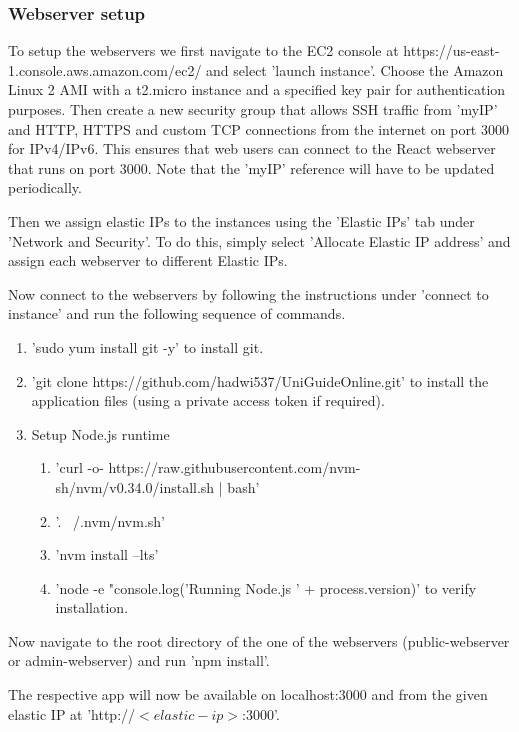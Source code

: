 \documentclass[12pt]{article}
\begin{document}
\subsubsection{Webserver setup}

To setup the webservers we first navigate to the EC2 console at \newline
https://us-east-1.console.aws.amazon.com/ec2/ and select 'launch instance'. Choose the Amazon Linux 2 AMI with a t2.micro instance and a specified key pair for authentication purposes. Then create a new security group that allows SSH traffic from 'myIP' and HTTP, HTTPS and custom TCP connections from the internet on port 3000 for IPv4/IPv6. This ensures that web users can connect to the React webserver that runs on port 3000. Note that the 'myIP' reference will have to be updated periodically. 

Then we assign elastic IPs to the instances using the 'Elastic IPs' tab under 'Network and Security'. To do this, simply select 'Allocate Elastic IP address' and assign each webserver to different Elastic IPs.

Now connect to the webservers by following the instructions under 'connect to instance' and run the following sequence of commands. 

\begin{enumerate}
    \item 'sudo yum install git -y' to install git.
    \item 'git clone https://github.com/hadwi537/UniGuideOnline.git' to install the application files (using a private access token if required).
    \item Setup Node.js runtime
    \begin{enumerate}
        \item 'curl -o- https://raw.githubusercontent.com/nvm-sh/nvm/v0.34.0/install.sh | bash'
        \item '. ~/.nvm/nvm.sh'
        \item 'nvm install --lts'
        \item 'node -e "console.log('Running Node.js ' + process.version)' to verify installation.
    \end{enumerate}
\end{enumerate}

Now navigate to the root directory of the one of the webservers (public-webserver or admin-webserver) and run 'npm install'.

The respective app will now be available on localhost:3000 and from the given elastic IP at 'http://$<elastic-ip>$:3000'.
\end{document}
